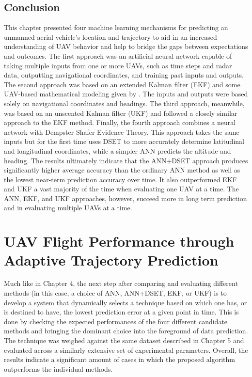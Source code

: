 \documentclass[12pt]{uthesis-v12}  %
\begin{document}
\section{Conclusion}
\label{conc}

This chapter presented four machine learning mechanisms for predicting an unmanned aerial vehicle's location and trajectory to aid in an increased understanding of UAV behavior and help to bridge the gaps between expectations and outcomes. 
The first approach was an artificial neural network capable of taking multiple inputs from one or more UAVs, such as time steps and radar data, outputting navigational coordinates, and training past inputs and outputs. 
The second approach was based on an extended Kalman filter (EKF) and some UAV-based mathematical modeling given by \cite{mao}. The inputs and outputs were based solely on navigational coordinates and headings. The third approach, meanwhile, was based on an unscented Kalman filter (UKF) and followed a closely similar approach to the EKF method.
Finally, the fourth approach combines a neural network with Dempster-Shafer Evidence Theory. 
This approach takes the same inputs but for the first time uses DSET to more accurately determine latitudinal and longitudinal coordinates, while a simpler ANN predicts the altitude and heading. 
The results ultimately indicate that the ANN+DSET approach produces significantly higher average accuracy than the ordinary ANN method as well as the lowest near-term prediction accuracy over time. It also outperformed EKF and UKF a vast majority of the time when evaluating one UAV at a time.
The ANN, EKF, and UKF approaches, however, succeed more in long term prediction and in evaluating multiple UAVs at a time.


\chapter{UAV Flight Performance through Adaptive Trajectory Prediction}

Much like in Chapter 4, the next step after comparing and evaluating different methods (in this case, a choice of ANN, ANN+DSET, EKF, or UKF) is to develop a system that dynamically selects a technique based on which one has, or is destined to have, the lowest prediction error at a given point in time. This is done by checking the expected performances of the four different candidate methods and bringing the dominant choice into the foreground of data prediction. The technique was weighed against the same dataset described in Chapter 5 and evaluated across a similarly extensive set of experimental parameters. Overall, the results indicate a significant amount of cases in which the proposed algorithm outperforms the individual methods.
\end{document}

